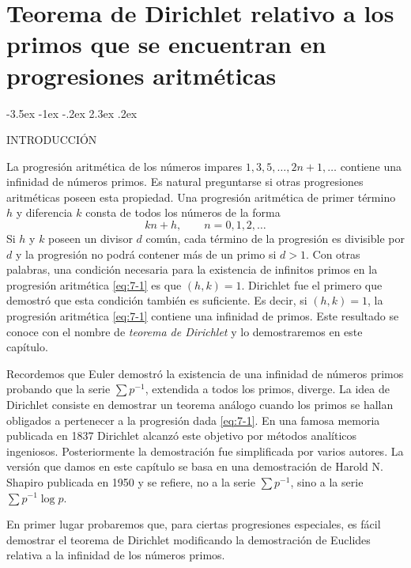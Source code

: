 \documentclass[12pt,a4paper]{book}
\makeatletter
\renewcommand\section{\@startsection{section}{1}{\z@}%
  {-3.5ex \@plus -1ex \@minus -.2ex}%
  {2.3ex \@plus .2ex}%
  {\normalfont\Large\bfseries\raggedright}}
\makeatother
\begin{document}
\chapter[Teorema de Dirichlet sobre primos en progresiones aritméticas]{Teorema de Dirichlet relativo a los primos que se encuentran en progresiones aritméticas}

    \section{INTRODUCCIÓN}

    La progresión aritmética de los números impares $1,3,5,\dots,2n+1,\dots$ contiene una
    infinidad de números primos. Es natural preguntarse si otras progresiones aritméticas
    poseen esta propiedad. Una progresión aritmética de primer término $h$ y diferencia $k$
    consta de todos los números de la forma
    \begin{equation}\label{eq:7-1}
        kn+h,\qquad n=0,1,2,\dots
    \end{equation}
    Si $h$ y $k$ poseen un divisor $d$ común, cada término de la progresión es divisible por
    $d$ y la progresión no podrá contener más de un primo si $d>1$. Con otras palabras, una
    condición necesaria para la existencia de infinitos primos en la progresión aritmética
    \eqref{eq:7-1} es que $(h,k)=1$. Dirichlet fue el primero que demostró que esta
    condición también es suficiente. Es decir, si $(h,k)=1$, la progresión aritmética
    \eqref{eq:7-1} contiene una infinidad de primos. Este resultado se conoce con el nombre
    de \textit{teorema de Dirichlet} y lo demostraremos en este capítulo.

    Recordemos que Euler \cite{euler1737} demostró la existencia de una infinidad de números primos
    probando que la serie $\sum p^{-1}$, extendida a todos los primos, diverge. La idea de
    Dirichlet consiste en demostrar un teorema análogo cuando los primos se hallan
    obligados a pertenecer a la progresión dada \eqref{eq:7-1}. En una famosa memoria \cite{dirichlet1837}
    publicada en 1837 Dirichlet alcanzó este objetivo por métodos analíticos ingeniosos.
    Posteriormente la demostración fue simplificada por varios autores. La versión que
    damos en este capítulo se basa en una demostración de Harold N. Shapiro publicada en
    1950 \cite{shapiro1952} y se refiere, no a la serie $\sum p^{-1}$, sino a la serie $\sum p^{-1}\log p$.

    En primer lugar probaremos que, para ciertas progresiones especiales, es fácil
    demostrar el teorema de Dirichlet modificando la demostración de Euclides relativa a la
    infinidad de los números primos.
\end{document}
